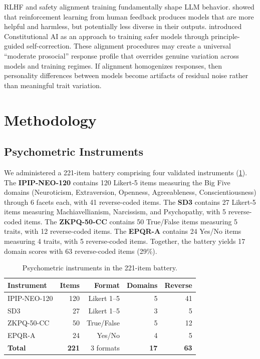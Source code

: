 \documentclass[11pt]{article}
\begin{document}
RLHF and safety alignment training fundamentally shape LLM behavior. \citet{ouyang2022training} showed that reinforcement learning from human feedback produces models that are more helpful and harmless, but potentially less diverse in their outputs. \citet{bai2022constitutional} introduced Constitutional AI as an approach to training safer models through principle-guided self-correction. These alignment procedures may create a universal ``moderate prosocial'' response profile that overrides genuine variation across models and training regimes. If alignment homogenizes responses, then personality differences between models become artifacts of residual noise rather than meaningful trait variation.

\section{Methodology}

\subsection{Psychometric Instruments}

We administered a 221-item battery comprising four validated instruments (\cref{tab:instruments}). The \textbf{IPIP-NEO-120} \citep{johnson2014measuring} contains 120 Likert-5 items measuring the Big Five domains (Neuroticism, Extraversion, Openness, Agreeableness, Conscientiousness) through 6 facets each, with 41 reverse-coded items. The \textbf{SD3} \citep{jones2014introducing} contains 27 Likert-5 items measuring Machiavellianism, Narcissism, and Psychopathy, with 5 reverse-coded items. The \textbf{ZKPQ-50-CC} \citep{aluja2006cross} contains 50 True/False items measuring 5 traits, with 12 reverse-coded items. The \textbf{EPQR-A} \citep{francis1992development} contains 24 Yes/No items measuring 4 traits, with 5 reverse-coded items. Together, the battery yields 17 domain scores with 63 reverse-coded items (29\%).

\begin{table}[t]
\centering
\caption{Psychometric instruments in the 221-item battery.}
\label{tab:instruments}
\begin{tabular}{lrrrr}
\toprule
Instrument & Items & Format & Domains & Reverse \\
\midrule
IPIP-NEO-120 & 120 & Likert 1--5 & 5 & 41 \\
SD3 & 27 & Likert 1--5 & 3 & 5 \\
ZKPQ-50-CC & 50 & True/False & 5 & 12 \\
EPQR-A & 24 & Yes/No & 4 & 5 \\
\midrule
\textbf{Total} & \textbf{221} & 3 formats & \textbf{17} & \textbf{63} \\
\bottomrule
\end{tabular}
\end{table}
\end{document}
